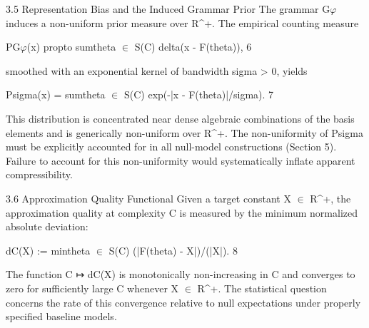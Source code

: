   3.5 Representation Bias and the Induced Grammar Prior
  The grammar G$\varphi$ induces a non-uniform prior measure over R\textasciicircum{}+. The empirical
  counting measure

  PG$\varphi$(x) propto sumtheta $\in$ S(C) delta(x - F(theta)), 6

  smoothed with an exponential kernel of bandwidth sigma > 0, yields

  Psigma(x) = sumtheta $\in$ S(C) exp(-|x - F(theta)|/sigma). 7

  This distribution is concentrated near dense algebraic combinations of the basis
  elements and is generically non-uniform over R\textasciicircum{}+. The non-uniformity of Psigma must
  be explicitly accounted for in all null-model constructions (Section 5). Failure to
  account for this non-uniformity would systematically inflate apparent compressibility.

  3.6 Approximation Quality Functional
  Given a target constant X $\in$ R\textasciicircum{}+, the approximation quality at complexity C is
  measured by the minimum normalized absolute deviation:

  dC(X) := mintheta $\in$ S(C) (|F(theta) - X|)/(|X|). 8

  The function C ↦ dC(X) is monotonically non-increasing in C and converges to zero for
  sufficiently large C whenever X $\in$ R\textasciicircum{}+. The statistical question concerns the rate of
  this convergence relative to null expectations under properly specified baseline models.

